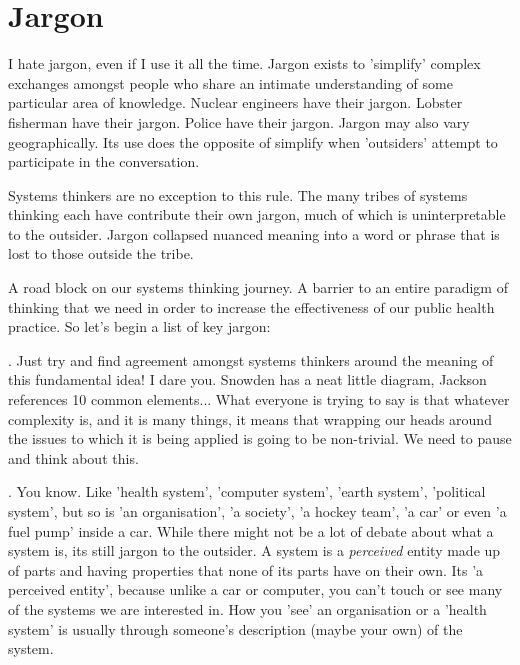 \chapter*{Jargon}


I hate jargon, even if I use it all the time. Jargon exists to 'simplify' complex exchanges amongst people who share an intimate understanding of some particular area of knowledge. Nuclear engineers have their jargon. Lobster fisherman have their jargon. Police have their jargon. Jargon may also vary geographically. Its use does the opposite of simplify when 'outsiders' attempt to participate in the conversation.

Systems thinkers are no exception to this rule. The many tribes of systems thinking each have contribute their own jargon, much of which is uninterpretable to the outsider. Jargon collapsed nuanced meaning into a word or phrase that is lost to those outside the tribe.

A road block on our systems thinking journey. A barrier to an entire paradigm of thinking that we need in order to increase the effectiveness of our public health practice. So let's begin a list of key jargon:

. Just try and find agreement amongst systems thinkers around the meaning of this fundamental idea! I dare you. Snowden has a neat little diagram, Jackson references 10 common elements... What everyone is trying to say is that whatever complexity is, and it is many things, it means that wrapping our heads around the issues to which it is being applied is going to be non-trivial. We need to pause and think about this.

. You know. Like 'health system', 'computer system', 'earth system', 'political system', but so is 'an organisation', 'a society', 'a hockey team', 'a car' or even 'a fuel pump' inside a car. While there might not be a lot of debate about what a system is, its still jargon to the outsider. A system is a \emph{perceived} entity made up of parts and having properties that none of its parts have on their own. Its 'a perceived entity', because unlike a car or computer, you can't touch or see many of the systems we are interested in. How you 'see' an organisation or a 'health system' is usually through someone's description (maybe your own) of the system.

